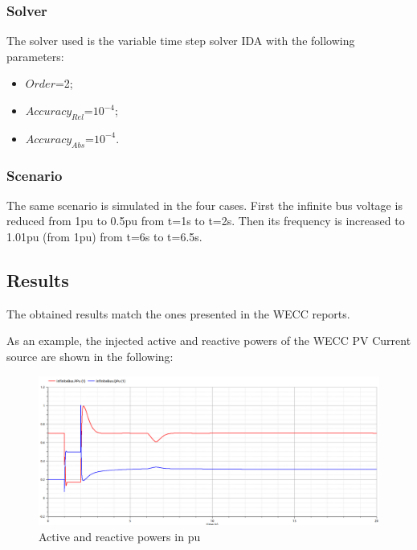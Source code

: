 \documentclass[a4paper, 12pt]{report}
\begin{document}
\subsubsection{Solver}

\par The solver used is the variable time step solver IDA with the following parameters:
\begin{itemize}
\item $Order$=2;
\item $Accuracy_{Rel}$=$10^{-4}$;
\item $Accuracy_{Abs}$=$10^{-4}$.
\end{itemize}

\subsubsection{Scenario}

\par The same scenario is simulated in the four cases. First the infinite bus voltage is reduced from 1pu to 0.5pu from t=1s to t=2s. Then its frequency is increased to 1.01pu (from 1pu) from t=6s to t=6.5s.

\subsection{Results}

\par The obtained results match the ones presented in the WECC reports.

\par As an example, the injected active and reactive powers of the WECC PV Current source are shown in the following:

\begin{figure}[H]
  \includegraphics[width=\textwidth]{PQWECC.png}
  \caption{Active and reactive powers in pu}
\end{figure}
\end{document}
